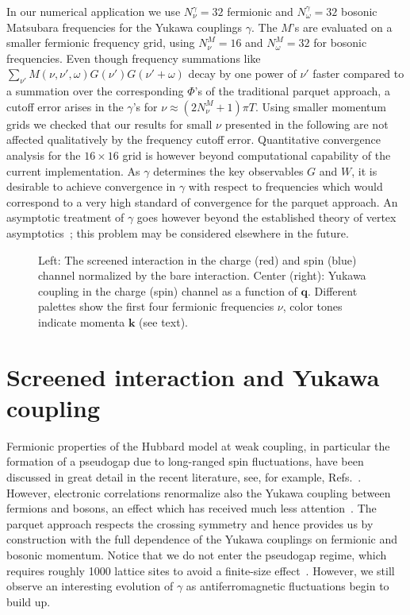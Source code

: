 \documentclass[epj]{svjour}
\newcommand{\kv}{\ensuremath{\mathbf{k}}}
\newcommand{\qv}{\ensuremath{\mathbf{q}}}
\begin{document}
In our numerical application we use $N^\gamma_\nu=32$ fermionic and $N^\gamma_\omega=32$
bosonic Matsubara frequencies for the Yukawa couplings $\gamma$.
The $M$'s are evaluated on a smaller fermionic frequency grid, using $N^M_\nu=16$ and  $N^M_\omega=32$ for bosonic frequencies.
Even though frequency summations like $\sum_{\nu'} M(\nu,\nu',\omega)G(\nu')G(\nu'+\omega)$ decay by one power of $\nu'$
faster compared to a summation over the corresponding $\Phi$'s of the traditional parquet approach,
a cutoff error arises in the $\gamma$'s for $\nu\approx (2N^M_\nu+1)\pi T$.
Using smaller momentum grids we checked that our results for small $\nu$ presented in the following
are not affected qualitatively by the frequency cutoff error. Quantitative convergence analysis for the $16\times16$ grid is however beyond computational capability of the current implementation.
As $\gamma$ determines the key observables $G$ and $W$, it is desirable to achieve convergence in $\gamma$ with respect to frequencies which would
correspond to a very high standard of convergence for the parquet approach.
An asymptotic treatment of $\gamma$ goes however beyond the established theory of vertex asymptotics~\cite{Wentzell20};
this problem may be considered elsewhere in the future.


\begin{figure*}
  \begin{center}
\end{center}
    \caption{\label{fig:wq} Left: The screened interaction in the charge (red) and spin (blue) channel normalized by the bare interaction. Center (right): Yukawa coupling in the charge
    (spin) channel as a function of $\qv$. Different palettes
    show the first four fermionic frequencies $\nu$, color
    tones indicate momenta $\kv$ (see text).
    }
\end{figure*}

\section{Screened interaction and Yukawa coupling}\label{sec:wq}
Fermionic properties of the Hubbard model at weak coupling,
in particular the formation of a pseudogap due to long-ranged spin fluctuations,
have been discussed in great detail in the recent literature, see, for example, Refs.~\cite{Hille20-2,Schaefer21}.
However, electronic correlations renormalize also the Yukawa coupling between fermions and bosons,
an effect which has received much less attention~\cite{Krien20-2}.
The parquet approach respects the crossing symmetry and hence provides us by construction with the full dependence
of the Yukawa couplings on fermionic and bosonic momentum.
Notice that we do not enter the pseudogap regime,
which requires roughly 1000 lattice sites to avoid a finite-size effect~\cite{Schaefer21}.
However, we still observe an interesting evolution of $\gamma$ as antiferromagnetic fluctuations begin to build up.
\end{document}
